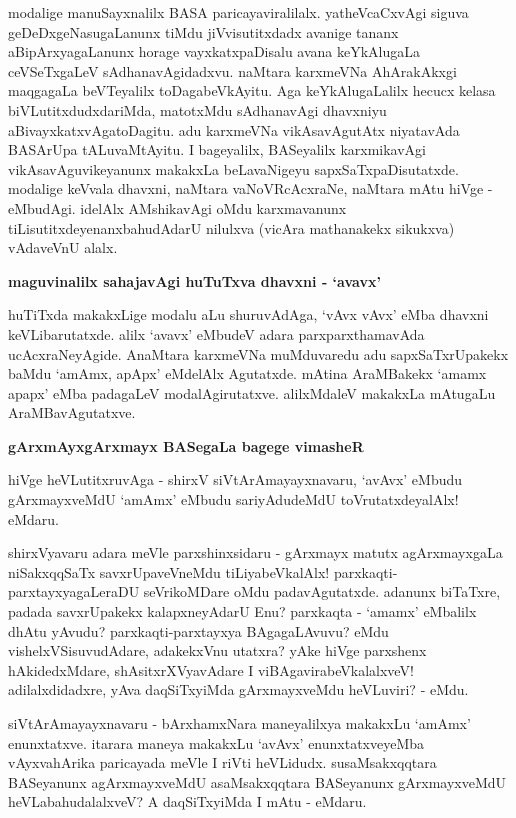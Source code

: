 modalige manuSayxnalilx BASA paricayaviralilalx. yatheVcaCxvAgi siguva geDeDx\-geNasugaLanunx tiMdu jiVvisutitxdadx avanige tananx aBipArxyagaLanunx horage vayxkatx\-paDisalu avana keYkAlugaLa ceVSeTxgaLeV sAdhana\-vAgidadxvu. naMtara karxmeVNa AhAra\-kAkxgi maqgagaLa beVTeyalilx toDagabeVkAyitu. Aga keYkAlugaLalilx hecucx kelasa biVLutitxdudxdariMda, matotxMdu sAdhanavAgi dhavxniyu aBivayxkatxvAgatoDagitu. adu karxmeVNa vikAsavAgutAtx niyatavAda BASArUpa tALuvaMtAyitu. I bageyalilx, BASeyalilx karxmikavAgi vikAsavAguvikeyanunx makakxLa beLavaNigeyu sapxSaTxpaDisutatxde. modalige keVvala dhavxni, naMtara vaNoVR\-cAcxraNe, naMtara mAtu hiVge - eMbudAgi. idelAlx AMshikavAgi oMdu karxmavanunx tiLisu\-titxde\-yenanx\-bahudAdarU nilulxva (vicAra mathanakekx sikukxva) vAdaveVnU alalx.

\newpage
{\noindent
{\large\bf maguvinalilx sahajavAgi huTuTxva dhavxni - `avavx'}}\label{page6}
\medskip

\noindent
huTiTxda makakxLige modalu aLu shuruvAdAga, `vAvx vAvx' eMba dhavxni keVLibarutatxde. alilx `avavx' eMbudeV\- adara parxparxthamavAda ucAcxraNeyAgide. AnaMtara karxmeVNa muMduvaredu adu sapxSaTxrUpakekx baMdu `amAmx, apApx' eMdelAlx Agutatxde. mAtina AraMBakekx `amamx apapx' eMba padagaLeV modalAgiru\-tatxve. alilxMdaleV makakxLa mAtugaLu AraMBavAgutatxve. 

{\medskip
\noindent
{\large\bf gArxmAyxgArxmayx BASegaLa bagege vimasheR}}\label{page6}
\medskip

\noindent
hiVge heVLutitxruvAga - shirxV siVtArAmayayxnavaru, `avAvx' eMbudu gArxmayxveMdU `amAmx' \-eMbudu sari\-yAdudeMdU toVrutatxdeyalAlx! eMdaru.

shirxVyavaru adara meVle parxshinxsidaru - gArxmayx matutx agArxmayxgaLa niSakxqqSaTx savxrUpaveVneMdu tiLiya\-beVkalAlx! parxkaqti-parxtayxyagaLeraDU seVrikoMDare oMdu padavAgutatxde. adanunx biTaTxre, padada savxrUpakekx kalapxneyAdarU Enu? parxkaqta - `amamx' eMbalilx dhAtu yAvudu? parxkaqti-parxtayxya BAgagaLAvuvu? eMdu vishelxVSisuvudAdare, adakekxVnu utatxra? yAke hiVge parxshenx hAkidedxMdare, shAsitxrXVyavAdare I viBAgavirabeVkalalxveV! adilalxdidadxre, yAva daqSiTxyiMda gArxmayxveMdu heVLuviri? - eMdu.

siVtArAmayayxnavaru - bArxhamxNara maneyalilxya makakxLu `amAmx' enunxtatxve. itarara maneya makakxLu `avAvx' enunxtatxveyeMba vAyxvahArika paricayada meVle I riVti heVLidudx. susaMsakxqqtara BASe\-yanunx agArxmayxveMdU asaMsakxqqtara BASeyanunx gArxmayxveMdU heVLabahudalalxveV? A daqSiTxyiMda I mAtu - eMdaru.


